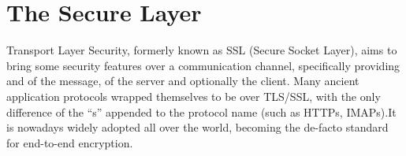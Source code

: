 \chapter{The Secure Layer \label{chap:ssl}}

Transport Layer Security, formerly known as SSL (Secure Socket Layer), aims
to bring some security features over a communication channel, specifically
providing  and  of the message,  of the server and
optionally the client.
Many ancient application protocols wrapped themselves to be over TLS/SSL, with
the only difference of the ``s'' appended to the protocol name (such as HTTPs,
IMAPs).It is nowadays widely adopted all over the world, becoming the de-facto standard for
end-to-end  encryption.

